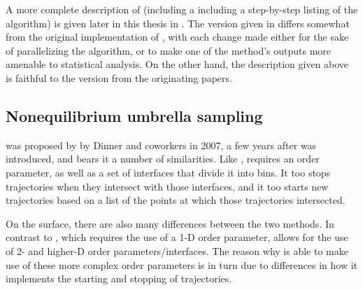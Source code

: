 
A more complete description of  (including a including a step-by-step listing of the algorithm) is given later in this thesis in . The version given in  differs somewhat from the original implementation of , with each change made either for the sake of parallelizing the algorithm, or to make one of the method's outputs more amenable to statistical analysis. On the other hand, the description given above is faithful to the version from the originating papers\supercite{Allen:2005wy,Allen:2006cp,Allen:2009kb}.

\subsection{Nonequilibrium umbrella sampling}
 was proposed by by Dinner and coworkers\supercite{Warmflash:2007dz} in 2007, a few years after  was introduced, and bears it a number of similarities. Like ,  requires an order parameter, as well as a set of interfaces that divide it into bins. It too stops trajectories when they intersect with those interfaces, and it too starts new trajectories based on a list of the points at which those trajectories intersected.

On the surface, there are also many differences between the two methods. In contrast to , which requires the use of a 1-D order parameter,  allows for the use of 2- and higher-D order parameters/interfaces. The reason why  is able to make use of these more complex order parameters is in turn due to differences in how it implements the starting and stopping of trajectories. 

